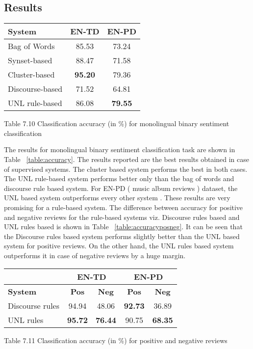 \subsection*{Results}\label{results}

\begin{center}
  \begin{tabular}[h]{|l|c|c|}
   \hline
   \textbf{System} & \textbf{EN-TD} & \textbf{EN-PD} \\ \hline \hline
   Bag of Words & 85.53 & 73.24 \\ \hline
   Synset-based & 88.47 & 71.58 \\ \hline
   Cluster-based & \textbf{95.20} & 79.36 \\ \hline
   Discourse-based & 71.52 & 64.81 \\ \hline
   UNL rule-based & 86.08 & \textbf{79.55} \\ \hline
   \hline
  \end{tabular}
\end{center}
\begin{center}
 Table 7.10 Classification accuracy (in \%) for monolingual binary sentiment classification
\end{center}

  
The results for monolingual binary sentiment classification task are shown in Table ~\ref{table:accuracy}. The results reported are the best results obtained in 
case of supervised systems. The cluster based system performs the best in both cases. The UNL rule-based system performs better only than the bag of words
and discourse rule based system. For EN-PD ( music album reviews ) dataset, the UNL based system outperforms every other system . These results are very promising 
for a rule-based system. The difference between accuracy for positive and negative reviews for the rule-based systems viz. Discourse rules based and UNL rules based 
is shown in Table ~\ref{table:accuracyposneg}. It can be seen that the Discourse rules based system performs slightly better than the UNL based system for positive 
reviews. On the other hand, the UNL rules based system outperforms it in case of negative reviews by a huge margin. 
  
\begin{center}
  \begin{tabular}[h]{l|c|c|c|c|}
   \cline{2-5}
    & \multicolumn{2}{|c|}{\textbf{EN-TD}} & \multicolumn{2}{|c|}{\textbf{EN-PD}} \\ \hline
    \textbf{System} & \textbf{Pos} & \textbf{Neg} & \textbf{Pos} & \textbf{Neg} \\ \hline \hline
    Discourse rules & 94.94 & 48.06 & \textbf{92.73} & 36.89 \\ \hline
    UNL rules & \textbf{95.72} & \textbf{76.44} & 90.75 & \textbf{68.35} \\ \hline
   \hline
  \end{tabular}
\end{center} 
\begin{center}
 Table 7.11 Classification accuracy (in \%) for positive and negative reviews
\end{center}

